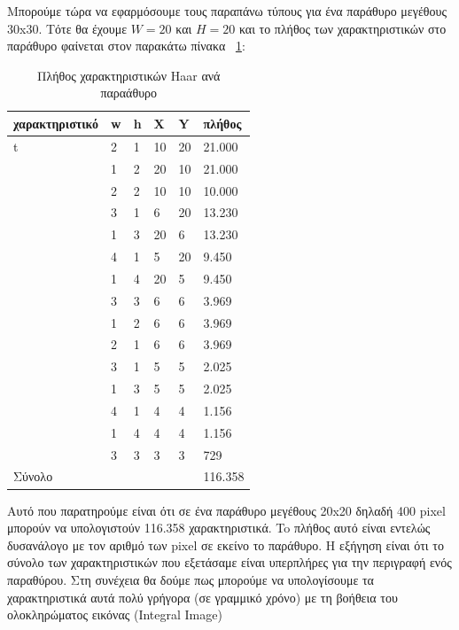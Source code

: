 Μπορούμε τώρα να εφαρμόσουμε τους παραπάνω τύπους για ένα παράθυρο μεγέθους 30x30.
Τότε θα έχουμε $W=20$ και $Η=20$ και το πλήθος των χαρακτηριστικών στο παράθυρο φαίνεται
στον παρακάτω πίνακα ~\ref{tab:haarsum}:


\begin{table}[htbp]
  \centering
    \begin{tabular}{ | l | l | l | l | l | l | }
    \hline
        χαρακτηριστικό  & w & h  & X  & Y & πλήθος \\ \hline
    \hline
        t  & 2 & 1 & 10 & 20 & 21.000 \\
    \hline
        & 1 & 2 & 20 & 10 & 21.000 \\
    \hline
        & 2 & 2 & 10 & 10  & 10.000\\
    \hline
        & 3 & 1 & 6 & 20 & 13.230 \\
    \hline
        & 1 & 3 & 20 & 6 & 13.230 \\
    \hline
        & 4 & 1 & 5 & 20 & 9.450\\
    \hline
        & 1 & 4 & 20 & 5 & 9.450\\
    \hline
        & 3 & 3 & 6 & 6 & 3.969 \\
    \hline
        & 1 & 2 & 6 & 6 & 3.969\\
    \hline
        & 2 & 1 & 6 & 6 & 3.969\\
    \hline
        & 3 & 1 & 5 & 5 & 2.025 \\
    \hline
        & 1 & 3 & 5 & 5 & 2.025 \\
    \hline
        & 4 & 1 & 4 & 4 & 1.156 \\
    \hline
        & 1 & 4 & 4 & 4 & 1.156 \\
    \hline
        & 3 & 3 & 3 & 3 & 729 \\
    \hline
        Σύνολο & & & & &116.358 \\
    \hline
  \end{tabular}
  \caption{Πλήθος χαρακτηριστικών Haar ανά παραάθυρο}
  \label{tab:haarsum}
\end{table}

Αυτό που παρατηρούμε είναι ότι σε ένα παράθυρο μεγέθους 20x20 δηλαδή 400 pixel
μπορούν να υπολογιστούν 116.358 χαρακτηριστικά. To πλήθος αυτό είναι
εντελώς δυσανάλογο με τον αριθμό των pixel σε εκείνο το παράθυρο.
Η εξήγηση είναι ότι το σύνολο των χαρακτηριστικών που εξετάσαμε είναι υπερπλήρες
για την περιγραφή ενός παραθύρου.
Στη συνέχεια θα δούμε πως μπορούμε να υπολογίσουμε τα χαρακτηριστικά αυτά
πολύ γρήγορα (σε γραμμικό χρόνο) με τη βοήθεια του ολοκληρώματος εικόνας (Integral Image)


